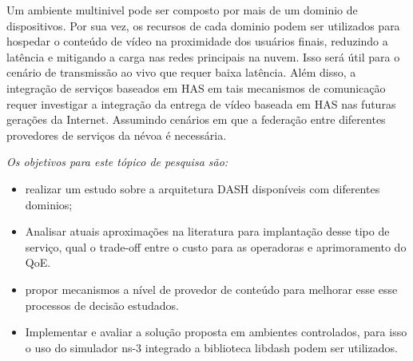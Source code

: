 Um ambiente multinivel pode ser composto por mais de um dominio de dispositivos. Por sua vez, 
os recursos de cada dominio podem ser utilizados para hospedar o conteúdo de vídeo na proximidade dos usuários finais, reduzindo a latência e mitigando a carga nas redes principais na nuvem. Isso será útil para o cenário de transmissão ao vivo que requer baixa latência. Além disso, a integração de serviços baseados em HAS em tais mecanismos de comunicação requer investigar a integração da entrega de vídeo baseada em HAS nas futuras gerações da Internet.
Assumindo cenários em que a federação entre diferentes provedores de serviços da névoa é necessária.

\emph{Os objetivos para este tópico de pesquisa são: }  

\begin{itemize}
	\item realizar um estudo sobre a arquitetura DASH disponíveis com diferentes dominios;
    \item Analisar atuais aproximações na literatura para implantação desse tipo de serviço, qual o trade-off entre o custo para as operadoras e aprimoramento do QoE.
    \item propor mecanismos a nível de provedor de conteúdo para melhorar esse esse processos de decisão estudados.
    \item Implementar e avaliar a solução proposta em ambientes controlados, para isso o uso do simulador ns-3 integrado a biblioteca libdash podem ser utilizados.   
\end{itemize}
%
%
%
%
%
